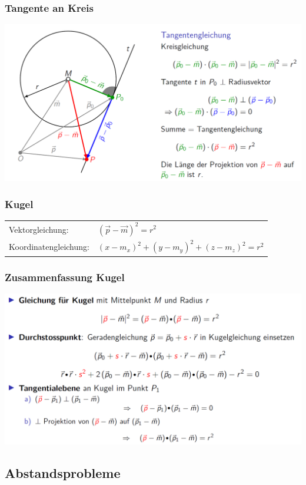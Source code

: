 			\subsubsection{Tangente an Kreis}
			\includegraphics[width=0.8\linewidth]{Bilder/kreis-tangente}	
			
			
			\subsubsection{Kugel}
			\begin{tabular}{ll}
			Vektorgleichung: & $(\vec{p} - \vec{m})^2 = r^2$\\
			Koordinatengleichung: & $(x - m_x)^2 + (y - m_y)^2 + (z - m_z)^2 = r^2$\\
			\end{tabular}
			
			\subsubsection{Zusammenfassung Kugel}
			\includegraphics[width=0.8\linewidth]{Bilder/kugel}	
			
			
			
				
			
			
			
			\subsection{Abstandsprobleme}
		

